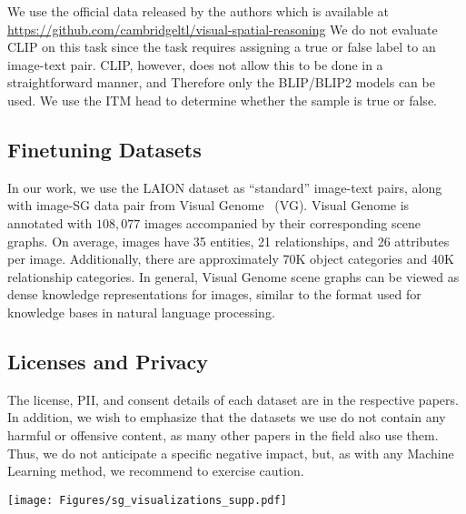 \documentclass[11pt]{article}
\newcommand{\minisection}[1]{\noindent{\textbf{#1}.}}
\begin{document}
\minisection{Inference details} We use the official data released by the authors which is available at \url{https://github.com/cambridgeltl/visual-spatial-reasoning} We do not evaluate CLIP on this task since the task requires assigning a true or false label to an image-text pair. CLIP, however, does not allow this to be done in a straightforward manner, and Therefore only the BLIP/BLIP2 models can be used. We use the ITM head to determine whether the sample is true or false.

\subsection{Finetuning Datasets}
\label{supp:datasets}

In our work, we use the LAION dataset as ``standard'' image-text pairs, along with image-SG data pair from Visual Genome~\cite{krishna2017visual} (VG). Visual Genome is annotated with $108,077$ images accompanied by their corresponding scene graphs. On average, images have 35 entities, 21 relationships, and 26 attributes per image. Additionally, there are approximately 70K object categories and 40K relationship categories. In general, Visual Genome scene graphs can be viewed as dense knowledge representations for images, similar to the format used for knowledge bases in natural language processing.








\subsection{Licenses and Privacy}
\label{supp:datasets:Licenses}
The license, PII, and consent details of each dataset are in the respective papers. In addition, we wish to emphasize that the datasets we use do not contain any harmful or offensive content, as many other papers in the field also use them. Thus, we do not anticipate a specific negative impact, but, as with any Machine Learning method, we recommend to exercise caution. 













\begin{figure*}
\centering
    \texttt{[image: Figures/sg\_visualizations\_supp.pdf]}
    \label{supp:fig:sg_visualization}
\end{figure*}
\end{document}
